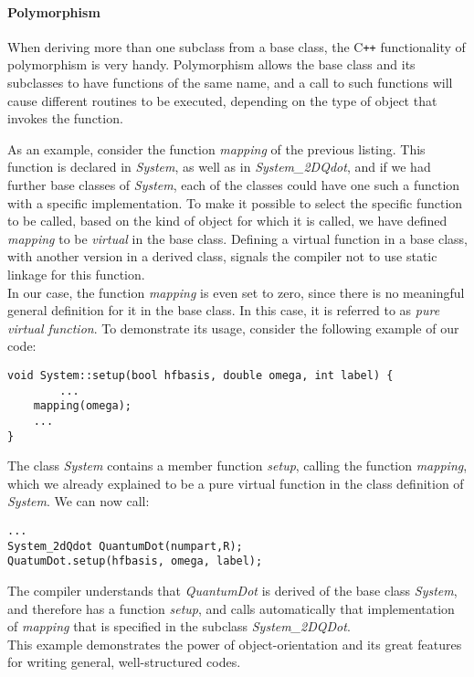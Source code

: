 \paragraph{Polymorphism}
When deriving more than one subclass from a base class, the C{}\verb!++! functionality of polymorphism is very handy. Polymorphism allows the base class and its subclasses to have functions of the same name, and a call to such functions will cause different routines to be executed,
depending on the type of object that invokes the function. 

As an example, consider the function \textit{mapping} of the previous listing. This function is declared in \textit{System}, as well as in \textit{System\_2DQdot}, and if we had further base classes of \textit{System}, each of the classes could have one such a function with a specific implementation.  To make it possible to select the specific function to be called, based on the kind of object for which it is called, we have defined \textit{mapping} to be \textit{virtual} in the base class.
Defining a virtual function in a base class, with another version in a derived class, signals the compiler not to use static linkage for this function. \\
In our case, the function \textit{mapping} is even set to zero, since there is no meaningful general definition for it in the base class. In this case, it is referred to as \textit{pure virtual function}. To demonstrate its usage, consider the following example of our code:

\begin{lstlisting}[backgroundcolor=\color{lighter-gray}, numbers=none]
void System::setup(bool hfbasis, double omega, int label) {
        ...
    mapping(omega); 
    ...   
}
\end{lstlisting}

The class \textit{System} contains a member function \textit{setup}, calling the function \textit{mapping}, which we already explained to be a pure virtual function in the class definition of \textit{System}. We can now call:

\begin{lstlisting}[backgroundcolor=\color{lighter-gray}, numbers=none]
...
System_2dQdot QuantumDot(numpart,R);
QuatumDot.setup(hfbasis, omega, label);
\end{lstlisting}
The compiler understands that \textit{QuantumDot} is derived of the base class \textit{System}, and therefore has a function \textit{setup}, and calls automatically that implementation of \textit{mapping} that is specified in the subclass \textit{System\_2DQDot}.\\
This example demonstrates the power of object-orientation and its great features for writing general, well-structured codes.

\nocite{C++tutorial}

